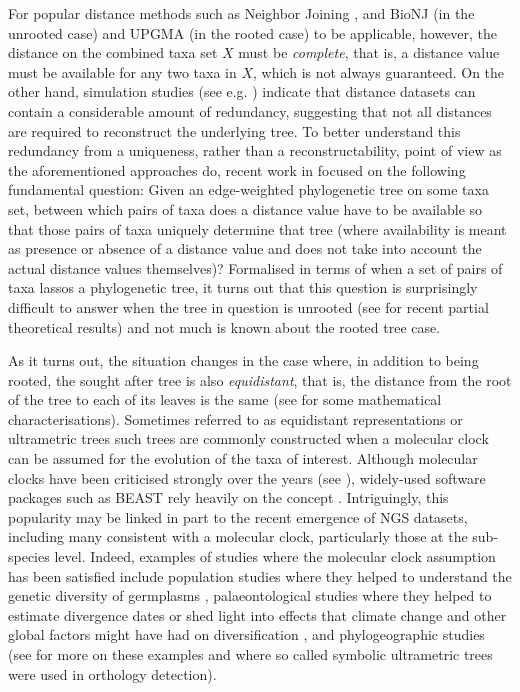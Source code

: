 For popular distance methods such as Neighbor Joining \cite{saitou1987nj}, and
BioNJ \cite{gascuel97bionj} (in the unrooted case) and \textsc{UPGMA}
\cite{sokal1958statistical} (in the rooted case) to be applicable, however,
the distance on the combined taxa set $X$ must be {\em complete}, that is, a
distance value must be available for any two taxa in $X$, which is not always
guaranteed. On the other hand, simulation studies (see
e.g. \cite{criscuolo2006sdm}) indicate that distance datasets can contain a
considerable amount of redundancy, suggesting that not all distances are
required to reconstruct the underlying tree. To better understand this
redundancy from a uniqueness, rather than a reconstructability, point of view
as the aforementioned approaches do, recent work in \cite{dress11lassoing}
focused on the following fundamental question: Given an edge-weighted
phylogenetic tree on some taxa set, between which pairs of taxa does a
distance value have to be available so that those pairs of taxa uniquely
determine that tree (where availability is meant as presence or absence of a
distance value and does not take into account the actual distance values
themselves)? Formalised in terms of when a set of pairs of taxa lassos a
phylogenetic tree, it turns out that this question is surprisingly difficult
to answer when the tree in question is unrooted (see
\cite{dress11lassoing,huber2014tree} for recent partial theoretical results)
and not much is known about the rooted tree case.

As it turns out, the situation changes in the case where, in addition to being
rooted, the sought after tree is also {\em equidistant}, that is, the distance
from the root of the tree to each of its leaves is the same (see
\cite{huber13lassoing} for some mathematical characterisations).  Sometimes
referred to as equidistant representations \cite{semple2003phylogenetics} or
ultrametric trees such trees are commonly constructed when a molecular clock
can be assumed for the evolution of the taxa of interest.  Although molecular
clocks have been criticised strongly over the years (see
\cite{ayala99molecular,schwartz06molecular}), widely-used software packages
such as BEAST rely heavily on the concept \cite{bouckaert14beast}.
Intriguingly, this popularity may be linked in part to the recent emergence of
NGS datasets, including many consistent with a molecular clock, particularly
those at the sub-species level.  Indeed, examples of studies where the
molecular clock assumption has been satisfied include population studies where
they helped to understand the genetic diversity of germplasms
\cite{xiao10ssr}, palaeontological studies where they helped to estimate
divergence dates or shed light into effects that climate change and other
global factors might have had on diversification \cite{weir08ice}, and
phylogeographic studies \cite{confal1998mitochon} (see
\cite{weir08calibrating} for more on these examples and
\cite{hellmuth13orthology} where so called symbolic ultrametric trees were
used in orthology detection).

